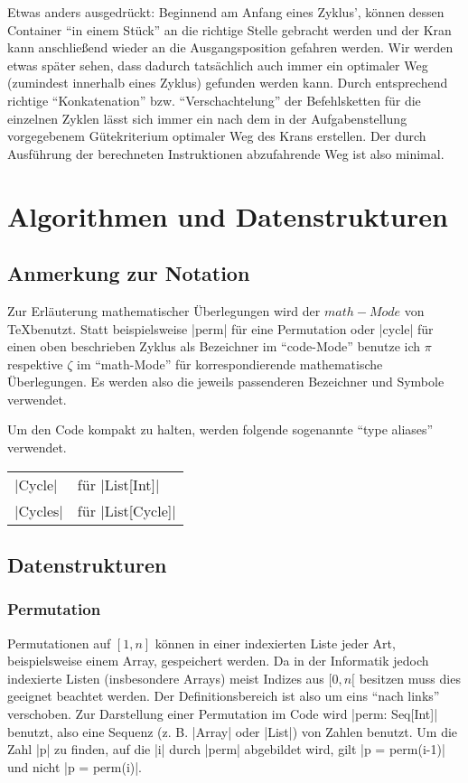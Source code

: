 Etwas anders ausgedrückt:
Beginnend am Anfang eines Zyklus', können dessen Container ``in einem Stück'' an die richtige Stelle gebracht werden
 und der Kran kann anschließend wieder an die Ausgangsposition gefahren werden.
Wir werden etwas später sehen, dass dadurch tatsächlich auch immer ein optimaler Weg (zumindest innerhalb eines Zyklus) gefunden werden kann.
Durch entsprechend richtige ``Konkatenation'' bzw. ``Verschachtelung'' der Befehlsketten für die einzelnen Zyklen lässt sich immer
 ein nach dem in der Aufgabenstellung vorgegebenem Gütekriterium optimaler Weg des Krans erstellen.
Der durch Ausführung der berechneten Instruktionen abzufahrende Weg ist also minimal.
\section{Algorithmen und Datenstrukturen}
\subsection{Anmerkung zur Notation}
Zur Erläuterung mathematischer Überlegungen wird der $math-Mode$ von \TeX benutzt.
Statt beispielsweise |perm| für eine Permutation oder |cycle| für einen oben beschrieben Zyklus als Bezeichner im ``code-Mode'' benutze ich $\pi$ respektive $\zeta$ im ``math-Mode''
 für korrespondierende mathematische Überlegungen.
Es werden also die jeweils passenderen Bezeichner und Symbole verwendet.

Um den Code kompakt zu halten, werden folgende sogenannte ``type aliases'' verwendet.

\hspace{2em}\begin{tabular}{ll}
 |Cycle|  & für |List[Int]| \\
 |Cycles| & für |List[Cycle]| \\
\end{tabular}
\subsection{Datenstrukturen}
\subsubsection{Permutation}
Permutationen auf $[1,n]$ können in einer indexierten Liste jeder Art, beispielsweise einem Array, gespeichert werden.
Da in der Informatik jedoch indexierte Listen (insbesondere Arrays) meist Indizes aus $[0,n[$ besitzen muss dies geeignet beachtet werden.
Der Definitionsbereich ist also um eins ``nach links'' verschoben.
Zur Darstellung einer Permutation im Code wird |perm: Seq[Int]| benutzt, also eine Sequenz (z. B. |Array| oder |List|) von Zahlen benutzt.
Um die Zahl |p| zu finden, auf die |i| durch |perm| abgebildet wird, gilt |p = perm(i-1)| und nicht |p = perm(i)|.
